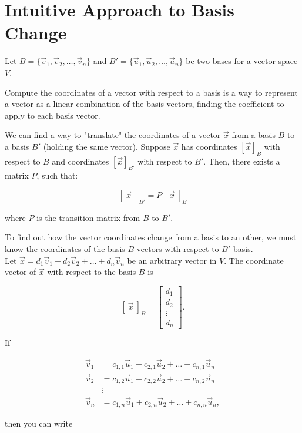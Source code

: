 \section{Intuitive Approach to Basis Change}

Let $B = \{\vec{v}_1, \vec{v}_2, \ldots, \vec{v}_n\}$ and $B' = \{\vec{u}_1, \vec{u}_2, \ldots, \vec{u}_n\}$ be two bases for a vector space $V$.

Compute the coordinates of a vector with respect to a basis is a way to represent a vector as a linear combination of the basis vectors, finding the coefficient to apply to each basis vector.

We can find a way to "translate" the coordinates of a vector $\vec{x}$ from a basis $B$ to a basis $B'$ (holding the same vector). Suppose $\vec{x}$ has coordinates $[\vec x]_B$ with respect to $B$ and coordinates $[\vec x]_{B'}$ with respect to $B'$. Then, there exists a matrix $P$, such that:

\[
[ \ \vec x \ ]_{B'} = P[\ \vec x \ ]_B
\]

where $P$ is the transition matrix from $B$ to $B'$.

To find out how the vector coordinates change from a basis to an other, we must know the coordinates of the basis $B$ vectors with respect to $B'$ basis.
\\

Let $\vec x = d_1 \vec v_1 + d_2 \vec v_2 + \ldots + d_n \vec v_n$ be an arbitrary vector in $V$. The coordinate vector of $\vec x$ with respect to the basis $B$ is

\[
[\ \vec x \ ]_B = \begin{bmatrix}
    d_1 \\
    d_2 \\
    \vdots \\
    d_n
\end{bmatrix}.
\]

If

\[
\begin{aligned}
    \vec v_1 &= c_{1,1} \vec u_1 + c_{2,1} \vec u_2 + \ldots + c_{n,1} \vec u_n \\
    \vec v_2 &= c_{1,2} \vec u_1 + c_{2,2} \vec u_2 + \ldots + c_{n,2} \vec u_n \\
    & \vdots \\
    \vec v_n &= c_{1,n} \vec u_1 + c_{2,n} \vec u_2 + \ldots + c_{n,n} \vec u_n,
\end{aligned}
\]

then you can write

